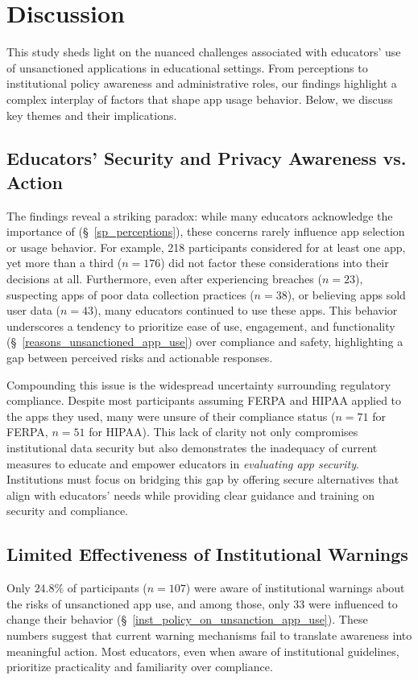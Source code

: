 \section{Discussion}
This study sheds light on the nuanced challenges associated with educators' use of unsanctioned applications in educational settings. 
From \sp perceptions to institutional policy awareness and administrative roles, our findings highlight a complex interplay of factors that shape app usage behavior. 
Below, we discuss key themes and their implications.

\subsection{Educators' Security and Privacy Awareness vs. Action}
The findings reveal a striking paradox: while many educators acknowledge the importance of \sp (\S~\ref{sp_perceptions}), these concerns rarely influence app selection or usage behavior. 
For example, 218 participants considered \sp for at least one app, yet more than a third ($n=176$) did not factor these considerations into their decisions at all. Furthermore, even after experiencing breaches ($n=23$), suspecting apps of poor data collection practices ($n=38$), or believing apps sold user data ($n=43$), many educators continued to use these apps. 
This behavior underscores a tendency to prioritize ease of use, engagement, and functionality (\S~\ref{reasons_unsanctioned_app_use}) over compliance and safety, highlighting a gap between perceived risks and actionable responses.  

Compounding this issue is the widespread uncertainty surrounding regulatory compliance. Despite most participants assuming FERPA and HIPAA applied to the apps they used, many were unsure of their compliance status ($n=71$ for FERPA, $n=51$ for HIPAA). 
This lack of clarity not only compromises institutional data security but also demonstrates the inadequacy of current measures to educate and empower educators in \emph{evaluating app security}. 
Institutions must focus on bridging this gap by offering secure alternatives that align with educators' needs while providing clear guidance and training on security and compliance.

\subsection{Limited Effectiveness of Institutional Warnings}
Only $24.8\%$ of participants ($n=107$) were aware of institutional warnings about the risks of unsanctioned app use, and among those, only 33 were influenced to change their behavior (\S~\ref{inst_policy_on_unsanction_app_use}). 
These numbers suggest that current warning mechanisms fail to translate awareness into meaningful action. 
Most educators, even when aware of institutional guidelines, prioritize practicality and familiarity over compliance.  

